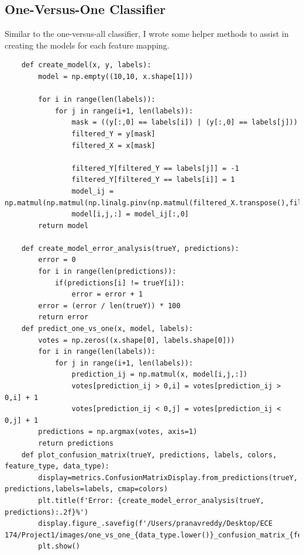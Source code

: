 \documentclass{article}
\begin{document}
\subsection{One-Versus-One Classifier}
Similar to the one-versus-all classifier, I wrote some helper methods to assist in creating the models for each feature mapping.
\begin{lstlisting}
    def create_model(x, y, labels):
        model = np.empty((10,10, x.shape[1]))

        for i in range(len(labels)):
            for j in range(i+1, len(labels)):
                mask = ((y[:,0] == labels[i]) | (y[:,0] == labels[j]))
                filtered_Y = y[mask]
                filtered_X = x[mask]

                filtered_Y[filtered_Y == labels[j]] = -1
                filtered_Y[filtered_Y == labels[i]] = 1
                model_ij = np.matmul(np.matmul(np.linalg.pinv(np.matmul(filtered_X.transpose(),filtered_X)),filtered_X.transpose()),filtered_Y)
                model[i,j,:] = model_ij[:,0]
        return model

    def create_model_error_analysis(trueY, predictions):
        error = 0
        for i in range(len(predictions)):
            if(predictions[i] != trueY[i]):
                error = error + 1
        error = (error / len(trueY)) * 100
        return error
    def predict_one_vs_one(x, model, labels):
        votes = np.zeros((x.shape[0], labels.shape[0]))
        for i in range(len(labels)):
            for j in range(i+1, len(labels)):
                prediction_ij = np.matmul(x, model[i,j,:])
                votes[prediction_ij > 0,i] = votes[prediction_ij > 0,i] + 1
                votes[prediction_ij < 0,j] = votes[prediction_ij < 0,j] + 1
        predictions = np.argmax(votes, axis=1)
        return predictions
    def plot_confusion_matrix(trueY, predictions, labels, colors, feature_type, data_type):
        display=metrics.ConfusionMatrixDisplay.from_predictions(trueY, predictions,labels=labels, cmap=colors)
        plt.title(f'Error: {create_model_error_analysis(trueY, predictions):.2f}%')
        display.figure_.savefig(f'/Users/pranavreddy/Desktop/ECE 174/Project1/images/one_vs_one_{data_type.lower()}_confusion_matrix_{feature_type}.eps')
        plt.show()
\end{lstlisting}

\newpage
\FloatBarrier
\end{document}
